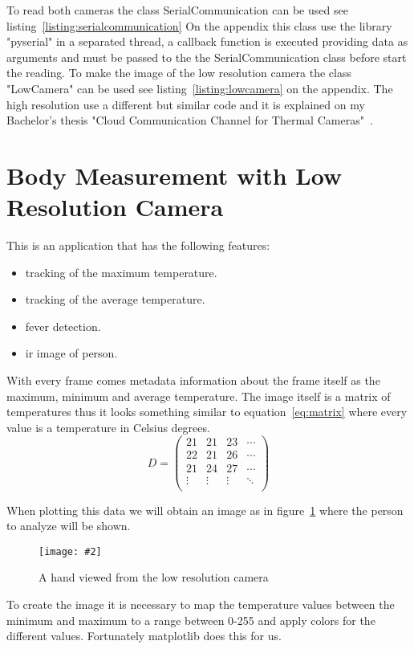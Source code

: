 \documentclass[hidelinks,11pt,a4paper,oneside,article]{memoir}
\newcommand{\putimage}[3][10] %
{
\begin{figure}[h]
    \centering
    \captionsetup{justification=centering}
    \texttt{[image: \#2]}
    \caption{#3}
    \label{fig:#2}
\end{figure}
}
\begin{document}
To read both cameras the class SerialCommunication can be used see listing~\ref{listing:serialcommunication} On the appendix this class use the library "pyserial" in a separated thread, a callback function is executed providing data as arguments and must be passed to the  the SerialCommunication class before start the reading. To make the image of the low resolution camera the class "LowCamera" can be used see listing~\ref{listing:lowcamera} on the  appendix. The high resolution use a different but similar code and it is explained on my Bachelor's thesis "Cloud Communication Channel for Thermal Cameras"~\cite{alvaroCloud}.


\section{Body Measurement with Low Resolution Camera}\label{sec:body-measurement-with-low-resolution-ir-camera}
This is an application that has the following features:
\begin{itemize}
    \item tracking of the maximum temperature.
    \item tracking of the average temperature.
    \item fever detection.
    \item \gls{ir} image of person.
\end{itemize}
With every frame comes metadata information about the frame itself as the maximum, minimum and average temperature. The image itself is a matrix of temperatures thus it looks something similar to equation~\ref{eq:matrix} where every value is a temperature in Celsius degrees.
\begin{equation}
\label{eq:matrix}
D = 
\begin{pmatrix}
21 & 21 & 23 & \cdots \\
22 & 21 & 26 & \cdots \\
21 & 24 & 27 & \cdots \\
\vdots & \vdots  & \vdots  & \ddots   \\

\end{pmatrix}
\end{equation}

When plotting this data we will obtain an image as in figure~\ref{fig:ir-hand} where the person to analyze will be shown.

    \putimage{ir-hand}{A hand viewed from the low resolution camera}

To create the image it is necessary to map the temperature values between the minimum and maximum to a range between 0-255 and apply colors for the different values. Fortunately matplotlib does this for us.
\end{document}
